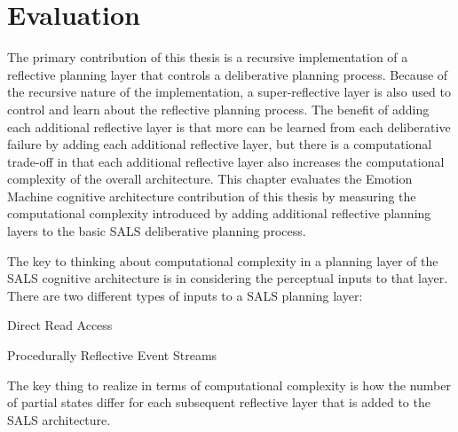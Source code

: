 \chapter{Evaluation}
\label{chapter:evaluation}

The primary contribution of this thesis is a recursive implementation
of a reflective planning layer that controls a deliberative planning
process.  Because of the recursive nature of the implementation, a
super-reflective layer is also used to control and learn about the
reflective planning process.  The benefit of adding each additional
reflective layer is that more can be learned from each deliberative
failure by adding each additional reflective layer, but there is a
computational trade-off in that each additional reflective layer also
increases the computational complexity of the overall architecture.
This chapter evaluates the Emotion Machine cognitive architecture
contribution of this thesis by measuring the computational complexity
introduced by adding additional reflective planning layers to the
basic SALS deliberative planning process.


The key to thinking about computational complexity in a planning layer
of the SALS cognitive architecture is in considering the perceptual
inputs to that layer.  There are two different types of inputs to a
SALS planning layer:
\begin{packed_enumerate}
\item{Direct Read Access}
\item{Procedurally Reflective Event Streams}
\end{packed_enumerate}

The key thing to realize in terms of computational complexity is how
the number of partial states differ for each subsequent reflective
layer that is added to the SALS architecture.

